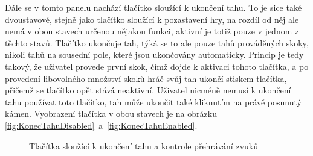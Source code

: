Dále se v tomto panelu nachází tlačítko sloužící k ukončení tahu. To je sice také dvoustavové, stejně jako tlačítko sloužící k pozastavení hry, na rozdíl od něj ale nemá v obou stavech určenou nějakou funkci, aktivní je totiž pouze v jednom z těchto stavů. Tlačítko ukončuje tah, týká se to ale pouze tahů prováděných skoky, nikoli tahů na sousední pole, které jsou ukončovány automaticky. Princip je tedy takový, že uživatel provede první skok, čímž dojde k aktivaci tohoto tlačítka, a po provedení libovolného množství skoků hráč svůj tah ukončí stiskem tlačítka, přičemž se tlačítko opět stává neaktivní. Uživatel nicméně nemusí k ukončení tahu používat toto tlačítko, tah může ukončit také kliknutím na právě posunutý kámen. Vyobrazení tlačítka v obou stavech je na obrázku \ref{fig:KonecTahuDisabled}~a~\ref{fig:KonecTahuEnabled}.

\begin{figure}
	\centering
	\hspace{2em} %
	\hspace{2em} %
	\hspace{2em} %
	\caption{Tlačítka sloužící k ukončení tahu a kontrole přehrávání zvuků}
	\label{fig:Tlacitka2}
\end{figure}

